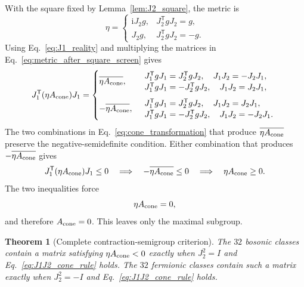 \documentclass[onecolumn,aps,prb,amsmath,amssymb,superscriptaddress,longbibliography,floatfix]{revtex4-2}
\newcommand{\ii}{\mathrm{i}}
\newcommand{\trans}{\mathsf{T}}
\newtheorem{theorem}{Theorem}
\begin{document}
With the square fixed by Lemma~\ref{lem:J2_square}, the metric is
\begin{equation}
\eta=
\begin{cases}
\ii J_2g,&J_2^\trans gJ_2=g,\\
J_2g,&J_2^\trans gJ_2=-g.
\end{cases}
\label{eq:metric_after_square_screen}
\end{equation}
Using Eq.~\eqref{eq:J1_reality} and multiplying the matrices in Eq.~\eqref{eq:metric_after_square_screen} gives
\begin{equation}
J_1^\trans(\eta A_{\rm cone})J_1=
\begin{cases}
\overline{\eta A_{\rm cone}},
&\begin{array}{l}
J_1^\trans gJ_1=J_2^\trans gJ_2,
\quad J_1J_2=-J_2J_1,\\[-1pt]
J_1^\trans gJ_1=-J_2^\trans gJ_2,
\quad J_1J_2=J_2J_1,
\end{array}\\[12pt]
-\overline{\eta A_{\rm cone}},
&\begin{array}{l}
J_1^\trans gJ_1=J_2^\trans gJ_2,
\quad J_1J_2=J_2J_1,\\[-1pt]
J_1^\trans gJ_1=-J_2^\trans gJ_2,
\quad J_1J_2=-J_2J_1.
\end{array}
\end{cases}
    \label{eq:cone_transformation}
\end{equation}
The two combinations in Eq.~\eqref{eq:cone_transformation} that produce
\(\overline{\eta A_{\rm cone}}\) preserve the negative-semidefinite
condition.  Either combination that produces
\(-\overline{\eta A_{\rm cone}}\) gives
\begin{equation}
    J_1^\trans(\eta A_{\rm cone})J_1\leq0
    \quad\Longrightarrow\quad
    -\overline{\eta A_{\rm cone}}\leq0
    \quad\Longrightarrow\quad
    \eta A_{\rm cone}\geq0.
    \label{eq:cone_sign_flip}
\end{equation}
The two inequalities force
\begin{equation}
    \eta A_{\rm cone}=0,
    \label{eq:reality_flip_boundary}
\end{equation}
and therefore \(A_{\rm cone}=0\).  This leaves only the maximal subgroup.

\begin{theorem}[Complete contraction-semigroup criterion]
The \(32\) bosonic classes contain a matrix satisfying \(\eta A_{\rm cone}<0\) exactly when \(J_2^2=I\) and Eq.~\eqref{eq:J1J2_cone_rule} holds.  The \(32\) fermionic classes contain such a matrix exactly when \(J_2^2=-I\) and Eq.~\eqref{eq:J1J2_cone_rule} holds.
\label{thm:complete_semigroup_criterion}
\end{theorem}
\end{document}
